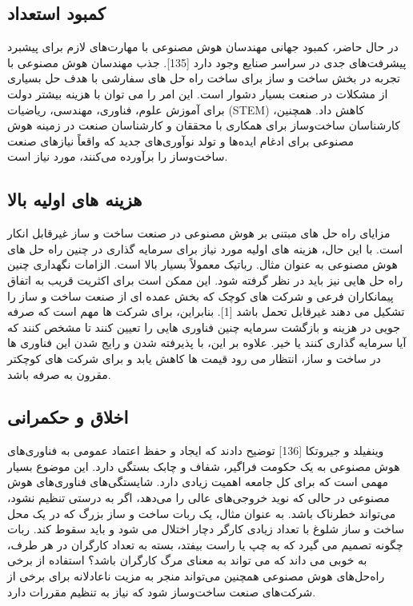 \documentclass[towcolumn, 11pt]{Article}
\begin{document}
\begin{چکیده}
\subsection{کمبود استعداد}
در حال حاضر، کمبود جهانی مهندسان هوش مصنوعی با مهارت‌های لازم برای پیشبرد پیشرفت‌های جدی در سراسر صنایع وجود دارد [135]. جذب مهندسان هوش مصنوعی با تجربه در بخش ساخت و ساز برای ساخت راه حل های سفارشی با هدف حل بسیاری از مشکلات در صنعت بسیار دشوار است. این امر را می توان با هزینه بیشتر دولت برای آموزش علوم، فناوری، مهندسی، ریاضیات (STEM) کاهش داد. همچنین، کارشناسان ساخت‌وساز برای همکاری با محققان و کارشناسان صنعت در زمینه هوش مصنوعی برای ادغام ایده‌ها و تولد نوآوری‌های جدید که واقعاً نیازهای صنعت ساخت‌وساز را برآورده می‌کنند، مورد نیاز است.

\subsection{هزینه های اولیه بالا}
مزایای راه حل های مبتنی بر هوش مصنوعی در صنعت ساخت و ساز غیرقابل انکار است. با این حال، هزینه های اولیه مورد نیاز برای سرمایه گذاری در چنین راه حل های هوش مصنوعی به عنوان مثال. رباتیک معمولاً بسیار بالا است. الزامات نگهداری چنین راه حل هایی نیز باید در نظر گرفته شود. این ممکن است برای اکثریت قریب به اتفاق پیمانکاران فرعی و شرکت های کوچک که بخش عمده ای از صنعت ساخت و ساز را تشکیل می دهند غیرقابل تحمل باشد [1]. بنابراین، برای شرکت ها مهم است که صرفه جویی در هزینه و بازگشت سرمایه چنین فناوری هایی را تعیین کنند تا مشخص کنند که آیا سرمایه گذاری کنند یا خیر. علاوه بر این، با پذیرفته شدن و رایج شدن این فناوری ها در ساخت و ساز، انتظار می رود قیمت ها کاهش یابد و برای شرکت های کوچکتر مقرون به صرفه باشد.

\subsection{اخلاق و حکمرانی}
وینفیلد و جیروتکا [136] توضیح دادند که ایجاد و حفظ اعتماد عمومی به فناوری‌های هوش مصنوعی به یک حکومت فراگیر، شفاف و چابک بستگی دارد. این موضوع بسیار مهمی است که برای کل جامعه اهمیت زیادی دارد. شایستگی‌های فناوری‌های هوش مصنوعی در حالی که نوید خروجی‌های عالی را می‌دهد، اگر به درستی تنظیم نشود، می‌تواند خطرناک باشد. به عنوان مثال، یک ربات ساخت و ساز بزرگ که در یک محل ساخت و ساز شلوغ با تعداد زیادی کارگر دچار اختلال می شود و باید سقوط کند. ربات چگونه تصمیم می گیرد که به چپ یا راست بیفتد، بسته به تعداد کارگران در هر طرف، به خوبی می داند که می تواند به معنای مرگ کارگران باشد؟ استفاده از برخی راه‌حل‌های هوش مصنوعی همچنین می‌تواند منجر به مزیت ناعادلانه برای برخی از شرکت‌های صنعت ساخت‌وساز شود که نیاز به تنظیم مقررات دارد.


\end{چکیده}
\end{document}
